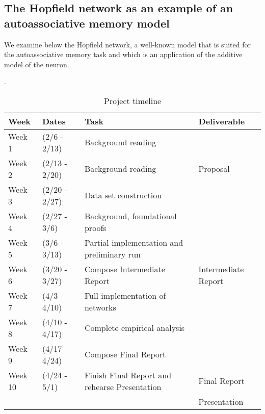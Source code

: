 \subsection{The Hopfield network as an example of an autoassociative memory model}

We examine below the Hopfield network, a well-known model that is suited for the autoassociative memory task and which is an application of the additive model of the neuron.

\cite{Yegnanarayana:2004:ANN:1197006}.

\begin{table*}[t]
  \caption{Project timeline}
  \label{tab:freq}
  \begin{tabular}{llll}
    \toprule
    Week & Dates & Task & Deliverable\\
    \midrule
    Week 1 & (2/6   - 2/13) & Background reading & \\
    Week 2 & (2/13  - 2/20) & Background reading & Proposal\\
    Week 3 & (2/20  - 2/27) & Data set construction & \\
    Week 4 & (2/27  - 3/6)  & Background, foundational proofs & \\
    Week 5 & (3/6   - 3/13) & Partial implementation and preliminary run & \\
    Week 6 & (3/20  - 3/27) & Compose Intermediate Report & Intermediate Report\\
    Week 7 & (4/3   - 4/10) & Full implementation of networks & \\
    Week 8 & (4/10  - 4/17) & Complete empirical analysis & \\
    Week 9 & (4/17  - 4/24) & Compose Final Report & \\
    Week 10 & (4/24 - 5/1) & Finish Final Report and rehearse Presentation & Final Report \\
    & & & Presentation\\
  \bottomrule
\end{tabular}
\end{table*}
